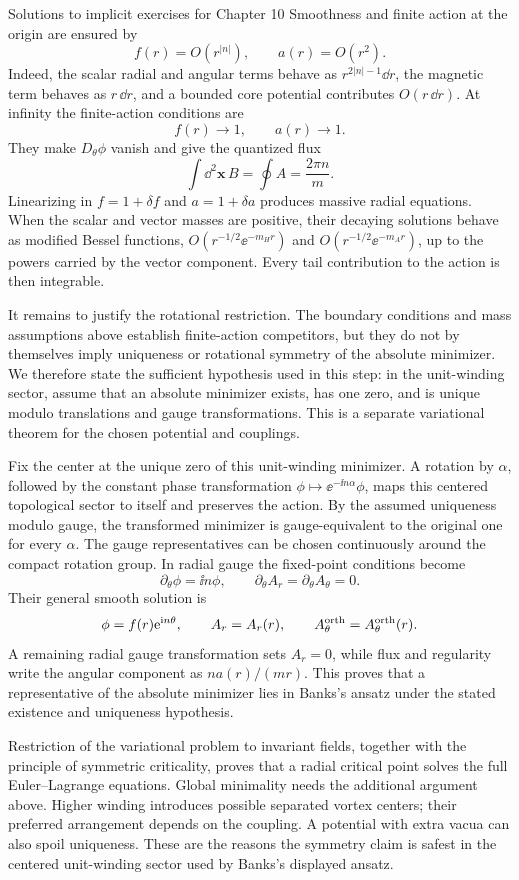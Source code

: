 \begin{bankssolutions}{Solutions to implicit exercises for Chapter 10}
Smoothness and finite action at the origin are ensured by
\[
  f(r)=O(r^{|n|}),
  \qquad a(r)=O(r^2).
\]
Indeed, the scalar radial and angular terms behave as $r^{2|n|-1}\dd r$,
the magnetic term behaves as $r\,\dd r$, and a bounded core potential
contributes $O(r\,\dd r)$.  At infinity the finite-action conditions are
\[
  f(r)\longrightarrow1,
  \qquad a(r)\longrightarrow1.
\]
They make $D_\theta\phi$ vanish and give the quantized flux
\[
  \int\dd^2\mathbf x\,B=\oint A=\frac{2\pi n}{m}.
\]
Linearizing in $f=1+\delta f$ and $a=1+\delta a$ produces massive radial
equations.  When the scalar and vector masses are positive, their decaying
solutions behave as modified Bessel functions,
$O(r^{-1/2}\ee^{-m_Hr})$ and $O(r^{-1/2}\ee^{-m_Ar})$, up to the powers carried
by the vector component.  Every tail contribution to the action is then
integrable.

It remains to justify the rotational restriction.  The boundary conditions
and mass assumptions above establish finite-action competitors, but they do
not by themselves imply uniqueness or rotational symmetry of the absolute
minimizer.  We therefore state the sufficient hypothesis used in this step:
in the unit-winding sector, assume that an absolute minimizer exists, has one
zero, and is unique modulo translations and gauge transformations.  This is a
separate variational theorem for the chosen potential and couplings.

Fix the center at the unique zero of this unit-winding minimizer.  A rotation
by $\alpha$, followed by
the constant phase transformation $\phi\mapsto\ee^{-\ii n\alpha}\phi$, maps
this centered topological sector to itself and preserves the action.  By the
assumed uniqueness modulo gauge, the transformed minimizer is gauge-equivalent
to the original one for every $\alpha$.  The gauge representatives can be
chosen continuously around the compact rotation group.  In radial gauge the
fixed-point conditions become
\[
  \partial_\theta\phi=\ii n\phi,
  \qquad \partial_\theta A_r=\partial_\theta A_\theta=0.
\]
Their general smooth solution is
\[
  \phi=f(r)\mathrm{e}^{\mathrm{i} n\theta},
  \qquad A_r=A_r(r),
  \qquad A_\theta^{\rm orth}=A_\theta^{\rm orth}(r).
\]
A remaining radial gauge transformation sets $A_r=0$, while flux and
regularity write the angular component as $n a(r)/(mr)$.  This proves that a
representative of the absolute minimizer lies in Banks's ansatz under the
stated existence and uniqueness hypothesis.

Restriction of the variational problem to invariant fields, together with the
principle of symmetric criticality, proves that a radial critical point solves
the full Euler--Lagrange equations.  Global minimality needs the additional
argument above.  Higher winding introduces possible separated vortex centers;
their preferred arrangement depends on the coupling.  A potential with extra
vacua can also spoil uniqueness.  These are the reasons the symmetry claim is
safest in the centered unit-winding sector used by Banks's displayed ansatz.


\end{bankssolutions}
